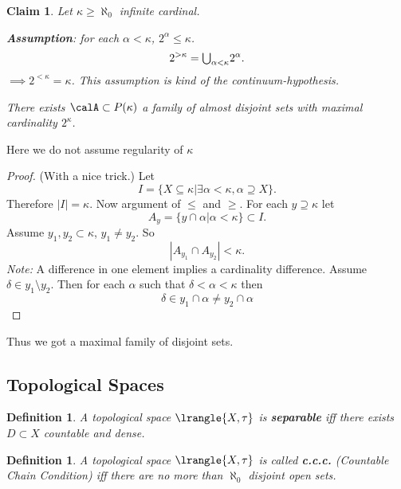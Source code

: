 \documentclass[11pt,pdftex,twoside,a4paper]{article}
\newcommand{\B}[1]{\textbf{#1}}
\newcommand{\ccc}{c.c.c.}
\newtheorem{ldef}[thm]{Definition}
\newtheorem{claim}[thm]{Claim}
\begin{document}
\begin{claim}
Let \(\kappa \geq \aleph_0\) infinite cardinal.

\B{Assumption}: for each \(\alpha < \kappa\), \(2^\alpha \leq \kappa\).
\begin{equation*}
2^{>\kappa} = \mathsmaller{\bigcup_{\alpha < \kappa}}2^\alpha.
\end{equation*}
\(\implies 2^{<\kappa} = \kappa\).
This assumption is kind of the continuum-hypothesis.

There exists \(\calA \subset P(\kappa)\) a family of almost disjoint sets
with maximal cardinality \(2^\kappa\).
\end{claim}
Here we do not assume regularity of \(\kappa\)
\begin{proof}
(With a nice trick.)
Let
\begin{equation*}
I = \{X \subseteq \kappa | \exists \alpha < \kappa, \alpha \supseteq X\}.
\end{equation*}
Therefore \(|I| = \kappa\).
Now argument of \(\leq\) and \(\geq\).
For each \(y \supseteq \kappa\) let
\begin{equation*}
A_y = \{y \cap \alpha | \alpha < \kappa\} \subset I.
\end{equation*}
Assume \(y_1,y_2 \subset \kappa\), \(y_1 \neq y_2\).
So 
\begin{equation*}
 |A_{y_1} \cap A_{y_2}| < \kappa.
\end{equation*}
\emph{Note:} A difference in one element implies a cardinality difference.
Assume \(\delta \in y_1 \setminus y_2\). Then for each \(\alpha\)
such that \(\delta < \alpha < \kappa\) then
\begin{equation*}
 \delta \in y_1\cap \alpha \neq y_2 \cap \alpha
\end{equation*}
\end{proof}
Thus we got a maximal family of disjoint sets.

\subsection{Topological Spaces}

\begin{ldef}
A topological space \(\lrangle{X, \tau}\) is \B{separable}
iff there exists \(D\subset X\) countable and dense.
\end{ldef}

\begin{ldef}
A topological space \(\lrangle{X, \tau}\) is called \B{\ccc} 
(Countable Chain Condition) iff there are no more than \(\aleph_0\)
disjoint open sets.
\end{ldef}
\end{document}
